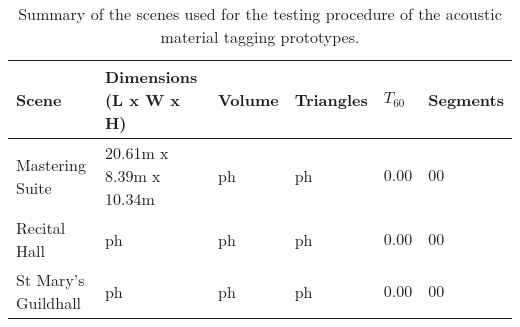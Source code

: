 \begin{table}[]
\centering
\begin{tabular}{@{}llllll@{}}
\toprule
Scene               & Dimensions (L x W x H)  & Volume & Triangles & $T_{60}$ & Segments \\ \midrule
Mastering Suite     & 20.61m x 8.39m x 10.34m & ph     & ph        & $0.00$   & $00$ \\
Recital Hall        & ph                       & ph     & ph        & $0.00$   & $00$ \\
St Mary's Guildhall & ph                       & ph     & ph        & $0.00$   & $00$ \\ \bottomrule
\end{tabular}
\caption{Summary of the scenes used for the testing procedure of the acoustic material tagging prototypes.}
\label{tab:material-eval-scenes}
\end{table}